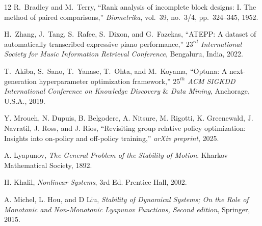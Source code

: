 \documentclass[letterpaper, 10 pt, conference]{ieeeconf}
\begin{document}
\begin{thebibliography}{12}
R.~Bradley and M.~Terry,
``Rank analysis of incomplete block designs: I. The method of paired comparisons,''
\emph{Biometrika}, vol.~39, no.~3/4, pp.~324--345, 1952.



H.~Zhang, J.~Tang, S.~Rafee, S.~Dixon, and G.~Fazekas,
``ATEPP: A dataset of automatically transcribed expressive piano performance,''
\emph{ $23^{rd}$ International Society for Music Information Retrieval Conference}, Bengaluru, India, 2022.

T.~Akiba, S.~Sano, T.~Yanase, T.~Ohta, and M.~Koyama,
``Optuna: A next-generation hyperparameter optimization framework,''
\emph{$25^{th}$ ACM SIGKDD International Conference on Knowledge Discovery $\&$ Data Mining}, Anchorage, U.S.A., 2019.


Y. Mroueh, N. Dupuis, B. Belgodere, A. Nitsure, M. Rigotti, K. Greenewald, J. Navratil, J. Ross, and J. Rios,
``Revisiting group relative policy optimization: Insights into on-policy and off-policy training,''
\emph{arXiv preprint}, 2025.


 A. Lyapunov,
\emph{The General Problem of the Stability of Motion}.
Kharkov Mathematical Society, 1892.

H. Khalil, \textit{Nonlinear Systems}, 3rd Ed. Prentice Hall, 2002.

A. Michel, L. Hou, and D Liu, \textit{Stability of Dynamical Systems;
On the Role of Monotonic and Non-Monotonic Lyapunov Functions, Second edition},  Springer,  2015.


\end{thebibliography}
\end{document}
